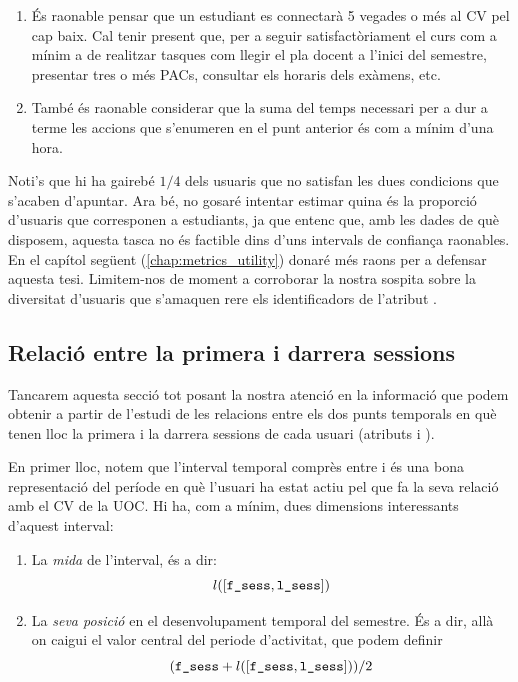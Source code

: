 \documentclass[
	a4paper,
	twoside,
	justified
]{tufte-book}
\begin{document}
\begin{enumerate}[(1)]

\item És raonable pensar que un estudiant es connectarà 5 vegades o més al CV pel cap baix. Cal tenir present que, per a seguir satisfactòriament el curs com a mínim a de realitzar tasques com llegir el pla docent a l'inici del semestre, presentar tres o més PACs, consultar els horaris dels exàmens, etc.

\item També és raonable considerar que la suma del temps necessari per a dur a terme les accions que s'enumeren en el punt anterior és com a mínim d'una hora. 

\end{enumerate}   

Noti's que hi ha gairebé $1/4$ dels usuaris que no satisfan les dues condicions que s'acaben d'apuntar. Ara bé, no gosaré intentar estimar quina és la proporció d'usuaris que corresponen a estudiants, ja que entenc que, amb les dades de què disposem, aquesta tasca no és factible dins d'uns intervals de confiança raonables. En el capítol següent (\ref{chap:metrics_utility}) donaré més raons per a defensar aquesta tesi. Limitem-nos de moment a corroborar la nostra sospita sobre la diversitat d'usuaris que s'amaquen rere els identificadors de l'atribut . 

\subsection{Relació entre la primera i darrera sessions}

Tancarem aquesta secció tot posant la nostra atenció en la informació que podem obtenir a partir de l'estudi de les relacions entre els dos punts temporals en què tenen lloc la primera i la darrera sessions de cada usuari (atributs  i ).

En primer lloc, notem que l'interval temporal comprès entre  i  és una bona representació del període en què l'usuari ha estat actiu pel que fa la seva relació amb el CV de la UOC. Hi ha, com a mínim, dues dimensions interessants d'aquest interval:

\begin{enumerate}[(1)]

\item La \emph{mida} de l'interval, és a dir:
	$$
	l([\texttt{f\_sess}, \texttt{l\_sess}])
	$$
	
\item La \emph{seva posició} en el desenvolupament temporal del semestre. És a dir, allà on caigui el valor central del periode d'activitat, que podem definir 
	$$
		(\texttt{f\_sess} + l([\texttt{f\_sess}, \texttt{l\_sess}])) / 2
	$$
\end{enumerate} 
\end{document}

